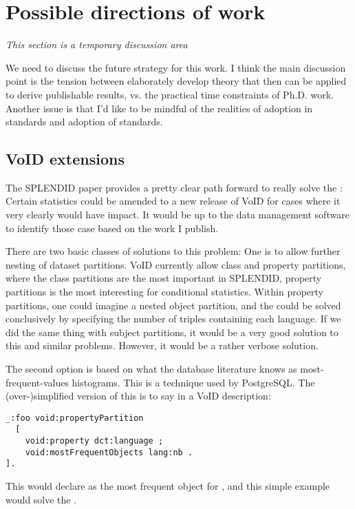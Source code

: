 \section{Possible directions of work}

\emph{This section is a temporary discussion area}

We need to discuss the future strategy for this work. I think the main
discussion point is the tension between elaborately develop theory
that then can be applied to derive publishable results, vs. the
practical time constraints of Ph.D. work. Another issue is that I'd
like to be mindful of the realities of adoption in standards and
adoption of standards.

\subsection{VoID extensions}

The SPLENDID paper provides a pretty clear path forward to really
solve the \langcase: Certain statistics could be amended to a new
release of VoID for cases where it very clearly would have impact. It
would be up to the data management software to identify those case
based on the work I publish.

There are two basic classes of solutions to this problem: One is to
allow further nesting of dataset partitions. VoID currently allow
class and property partitions, where the class partitions are the most
important in SPLENDID, property partitions is the most interesting for
conditional statistics. Within property partitions, one could imagine
a nested object partition, and the \langcase{} could be solved
conclusively by specifying the number of triples containing each
language. If we did the same thing with subject partitions, it would
be a very good solution to this and similar problems. However, it
would be a rather verbose solution. 

The second option is based on what the database literature knows as
most-frequent-values histograms. This is a technique used by
PostgreSQL. The (over-)simplified version of this is to say in a VoID
description: 

\begin{verbatim}
_:foo void:propertyPartition 
  [
    void:property dct:language ;
    void:mostFrequentObjects lang:nb .
].
\end{verbatim}
This would declare  as the most frequent object for
, and this simple example would solve the
\langcase. 

